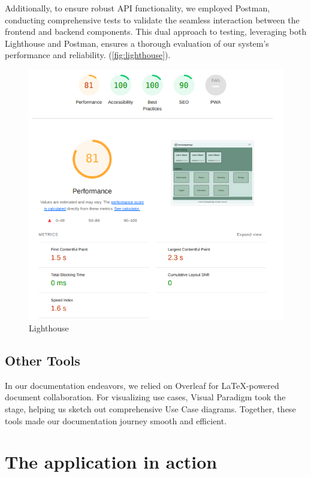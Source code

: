 \documentclass[12pt,a4paper]{article}
\begin{document}
\begin{spacing}{1.5}
    Additionally, to ensure robust API functionality, we employed Postman,
    conducting comprehensive tests to validate the seamless interaction between the
    frontend and backend components. This dual approach to testing, leveraging both
    Lighthouse and Postman, ensures a thorough evaluation of our system's
    performance and reliability. (\autoref{fig:lighthouse}).

    \begin{figure}[H]
        \centering
        \includegraphics[width=0.5\linewidth]{assets/KnowledgeBridgeLighthouse.png}
        \caption{Lighthouse}
        \label{fig:lighthouse}
    \end{figure}
    \FloatBarrier

    \subsection{Other Tools}
    In our documentation endeavors, we relied on Overleaf for LaTeX-powered
    document collaboration. For visualizing use cases, Visual Paradigm took the
    stage, helping us sketch out comprehensive Use Case diagrams. Together, these
    tools made our documentation journey smooth and efficient.

    \section{The application in action}

\end{spacing}
\end{document}
